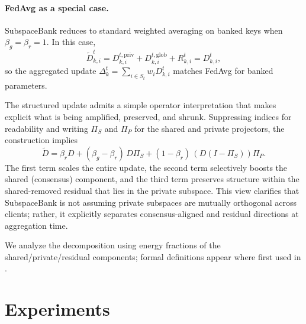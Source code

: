\documentclass{article}
\theoremstyle{plain}
\theoremstyle{definition}
\theoremstyle{remark}
\begin{document}
\paragraph{FedAvg as a special case.}
SubspaceBank reduces to standard weighted averaging on banked keys when $\beta_g=\beta_r=1$. In this case,
\[
\tilde D_{k,i}^t = D_{k,i}^{t,\mathrm{priv}} + D_{k,i}^{t,\mathrm{glob}} + R_{k,i}^t = D_{k,i}^t,
\]
so the aggregated update $\Delta_k^t=\sum_{i\in S_t} w_i D_{k,i}^t$ matches FedAvg for banked parameters.


The structured update admits a simple operator interpretation that makes explicit what is being amplified, preserved, and shrunk. Suppressing indices for readability and writing $\Pi_S$ and $\Pi_P$ for the shared and private projectors, the construction implies
\begin{equation}
  \tilde D
  = \beta_r D
  + (\beta_g-\beta_r)\,D\Pi_S
  + (1-\beta_r)\,(D(I-\Pi_S))\Pi_P.
  \label{eq:operator_view}
\end{equation}
The first term scales the entire update, the second term selectively boosts the shared (consensus) component, and the third term preserves structure within the shared-removed residual that lies in the private subspace. This view clarifies that SubspaceBank is not assuming private subspaces are mutually orthogonal across clients; rather, it explicitly separates consensus-aligned and residual directions at aggregation time.

We analyze the decomposition using energy fractions of the shared/private/residual components; formal definitions appear where first used in .



\section{Experiments}
\label{sec:experiments}
\end{document}
